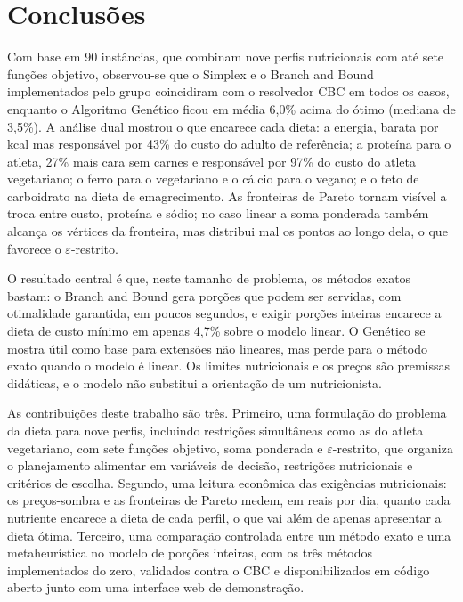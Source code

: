 \documentclass[12pt]{article}
\begin{document}
\begin{table}[!htbp]
\centering
\caption{Custo computacional por método.}\label{tab:tempos}
\footnotesize

\end{table}

\section{Conclusões}\label{sec:conclusao}

Com base em 90 instâncias, que combinam nove perfis nutricionais com até sete funções
objetivo, observou-se que o Simplex e o Branch and Bound implementados pelo grupo
coincidiram com o resolvedor CBC em todos os casos, enquanto o Algoritmo Genético
ficou em média 6{,}0\% acima do ótimo (mediana de 3{,}5\%). A análise
dual mostrou o que encarece cada dieta: a energia, barata por kcal mas responsável por
43\% do custo do adulto de referência; a proteína para o atleta,
27\% mais cara sem carnes e responsável por 97\% do custo do
atleta vegetariano; o ferro para o vegetariano e o cálcio para o vegano; e o teto de
carboidrato na dieta de emagrecimento. As fronteiras de Pareto tornam visível a troca
entre custo, proteína e sódio; no caso linear a soma ponderada também alcança os
vértices da fronteira, mas distribui mal os pontos ao longo dela, o que favorece o
$\varepsilon$-restrito.

O resultado central é que, neste tamanho de problema, os métodos exatos bastam: o
Branch and Bound gera porções que podem ser servidas, com otimalidade garantida, em
poucos segundos, e exigir porções inteiras encarece a dieta de custo mínimo em apenas
4{,}7\% sobre o modelo linear. O Genético se mostra útil como base para extensões
não lineares, mas perde para o método exato quando o modelo é linear. Os limites nutricionais e os preços
são premissas didáticas, e o modelo não substitui a orientação de um nutricionista.

As contribuições deste trabalho são três. Primeiro, uma formulação do problema da dieta
para nove perfis, incluindo restrições simultâneas como as do atleta vegetariano, com
sete funções objetivo, soma ponderada e $\varepsilon$-restrito, que organiza o
planejamento alimentar em variáveis de decisão, restrições nutricionais e critérios de
escolha. Segundo, uma leitura econômica das exigências nutricionais: os preços-sombra e
as fronteiras de Pareto medem, em reais por dia, quanto cada nutriente encarece a dieta
de cada perfil, o que vai além de apenas apresentar a dieta ótima. Terceiro, uma
comparação controlada entre um método exato e uma metaheurística no modelo de porções
inteiras, com os três métodos implementados do zero, validados contra o CBC e
disponibilizados em código aberto junto com uma interface web de demonstração.
\end{document}
